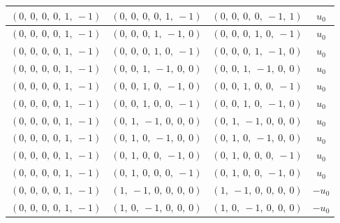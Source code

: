 \documentclass[11pt]{article}
\theoremstyle{definition}
\begin{document}
\begin{longtable}{|l|l|l|c|}
    \hline
    $\left( 0, \  0, \  0, \  0, \  1, \  -1\right)$ & $\left( 0, \  0, \  0, \  0, \  1, \  -1\right)$ & $\left( 0, \  0, \  0, \  0, \  -1, \  1\right)$ & $u_{0}$ \\
    \hline
    $\left( 0, \  0, \  0, \  0, \  1, \  -1\right)$ & $\left( 0, \  0, \  0, \  1, \  -1, \  0\right)$ & $\left( 0, \  0, \  0, \  1, \  0, \  -1\right)$ & $u_{0}$ \\
    \hline
    $\left( 0, \  0, \  0, \  0, \  1, \  -1\right)$ & $\left( 0, \  0, \  0, \  1, \  0, \  -1\right)$ & $\left( 0, \  0, \  0, \  1, \  -1, \  0\right)$ & $u_{0}$ \\
    \hline
    $\left( 0, \  0, \  0, \  0, \  1, \  -1\right)$ & $\left( 0, \  0, \  1, \  -1, \  0, \  0\right)$ & $\left( 0, \  0, \  1, \  -1, \  0, \  0\right)$ & $u_{0}$ \\
    \hline
    $\left( 0, \  0, \  0, \  0, \  1, \  -1\right)$ & $\left( 0, \  0, \  1, \  0, \  -1, \  0\right)$ & $\left( 0, \  0, \  1, \  0, \  0, \  -1\right)$ & $u_{0}$ \\
    \hline
    $\left( 0, \  0, \  0, \  0, \  1, \  -1\right)$ & $\left( 0, \  0, \  1, \  0, \  0, \  -1\right)$ & $\left( 0, \  0, \  1, \  0, \  -1, \  0\right)$ & $u_{0}$ \\
    \hline
    $\left( 0, \  0, \  0, \  0, \  1, \  -1\right)$ & $\left( 0, \  1, \  -1, \  0, \  0, \  0\right)$ & $\left( 0, \  1, \  -1, \  0, \  0, \  0\right)$ & $u_{0}$ \\
    \hline
    $\left( 0, \  0, \  0, \  0, \  1, \  -1\right)$ & $\left( 0, \  1, \  0, \  -1, \  0, \  0\right)$ & $\left( 0, \  1, \  0, \  -1, \  0, \  0\right)$ & $u_{0}$ \\
    \hline
    $\left( 0, \  0, \  0, \  0, \  1, \  -1\right)$ & $\left( 0, \  1, \  0, \  0, \  -1, \  0\right)$ & $\left( 0, \  1, \  0, \  0, \  0, \  -1\right)$ & $u_{0}$ \\
    \hline
    $\left( 0, \  0, \  0, \  0, \  1, \  -1\right)$ & $\left( 0, \  1, \  0, \  0, \  0, \  -1\right)$ & $\left( 0, \  1, \  0, \  0, \  -1, \  0\right)$ & $u_{0}$ \\
    \hline
    $\left( 0, \  0, \  0, \  0, \  1, \  -1\right)$ & $\left( 1, \  -1, \  0, \  0, \  0, \  0\right)$ & $\left( 1, \  -1, \  0, \  0, \  0, \  0\right)$ & $- u_{0}$ \\
    \hline
    $\left( 0, \  0, \  0, \  0, \  1, \  -1\right)$ & $\left( 1, \  0, \  -1, \  0, \  0, \  0\right)$ & $\left( 1, \  0, \  -1, \  0, \  0, \  0\right)$ & $- u_{0}$ \\

\end{longtable}
\end{document}
